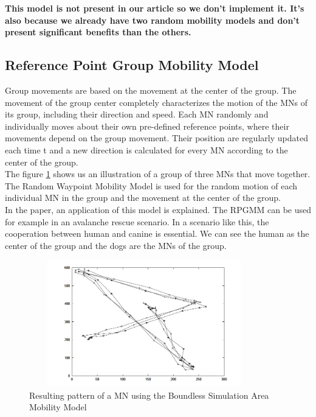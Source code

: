 \textbf{This model is not present in our article so we don't implement it. It's also because we already have two random mobility models and don't present significant benefits than the others.}

\newpage

\subsection{Reference Point Group Mobility Model}

Group movements are based on the movement at the center of the group. The movement of the group center completely characterizes the motion of the MNs of its group, including their direction and speed. Each MN randomly and individually moves about their own pre-defined reference points, where their movements depend on the group movement. Their position are regularly updated each time t and a new direction is calculated for every MN according to the center of the group.\\
The figure \ref{RPGMMFig} shows us an illustration of a group of three MNs that move together. The Random Waypoint Mobility Model is used for the random motion of each individual MN in the group and the movement at the center of the group.\\
In the paper, an application of this model is explained. The RPGMM can be used for example in an avalanche rescue scenario. In a scenario like this, the cooperation between human and canine is essential. We can see the human as the center of the group and the dogs are the MNs of the group.\\

\begin{figure}[h]
\center
\includegraphics[width=10cm,height=55mm]{../images/rpgmmodel1.png}
\caption{\label{RPGMMFig}Resulting pattern of a MN using the Boundless Simulation Area Mobility Model\cite{SurveyMobilityModelsAdHoc1}}
\end{figure}

